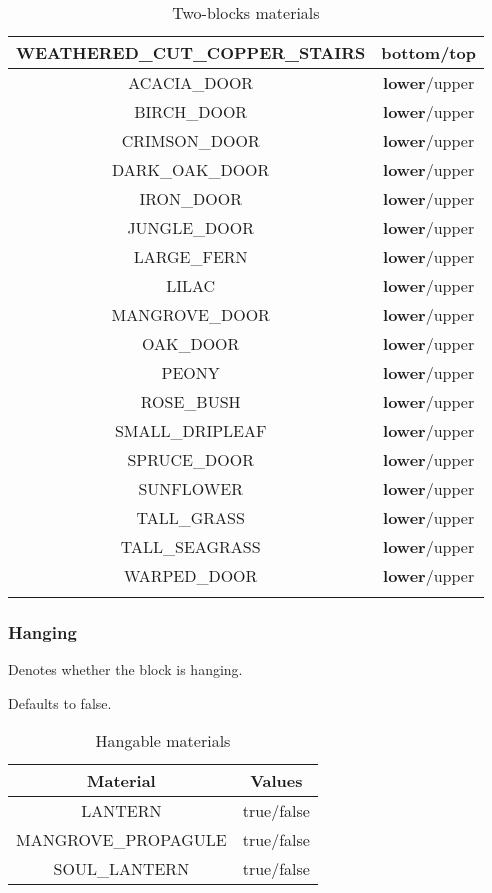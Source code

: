 \begin{longtable}{ |c|c| }
	WEATHERED\_CUT\_COPPER\_STAIRS & \textbf{bottom}/top \\
	\hline
	ACACIA\_DOOR & \textbf{lower}/upper \\
	BIRCH\_DOOR & \textbf{lower}/upper \\
	CRIMSON\_DOOR & \textbf{lower}/upper \\
	DARK\_OAK\_DOOR & \textbf{lower}/upper \\
	IRON\_DOOR & \textbf{lower}/upper \\
	JUNGLE\_DOOR & \textbf{lower}/upper \\
	LARGE\_FERN & \textbf{lower}/upper \\
	LILAC & \textbf{lower}/upper \\
	MANGROVE\_DOOR & \textbf{lower}/upper \\
	OAK\_DOOR & \textbf{lower}/upper \\
	PEONY & \textbf{lower}/upper \\
	ROSE\_BUSH & \textbf{lower}/upper \\
	SMALL\_DRIPLEAF & \textbf{lower}/upper \\
	SPRUCE\_DOOR & \textbf{lower}/upper \\
	SUNFLOWER & \textbf{lower}/upper \\
	TALL\_GRASS & \textbf{lower}/upper \\
	TALL\_SEAGRASS & \textbf{lower}/upper \\
	WARPED\_DOOR & \textbf{lower}/upper \\
	\hline
	\caption{Two-blocks materials}
\end{longtable}

\subsubsection{Hanging}
Denotes whether the block is hanging.

Defaults to false.

\begin{table}[H]
	\centering
	\begin{tabular}{ |c|c| }
		\hline
		Material & Values \\
		\hline
		LANTERN & true/false \\
		MANGROVE\_PROPAGULE & true/false \\
		SOUL\_LANTERN & true/false \\
		\hline
	\end{tabular}
	\caption{Hangable materials}
\end{table}

